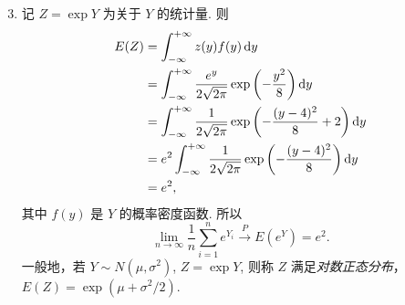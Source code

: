 \begin{solution}
    \begin{enumerate}
        \setcounter{enumi}{2}
        \item 记 $Z = \exp Y$ 为关于 $Y$ 的统计量. 则
        \begin{align*}
            E(Z) 
            &= \int_{-\infty}^{+\infty} z(y) f(y) \dif y \\
            &= \int_{-\infty}^{+\infty} \frac{e^y}{2\sqrt{2\pi}} \exp\del[3]{-\frac{y^2}{8}} \dif y \\
            &= \int_{-\infty}^{+\infty} \frac{1}{2\sqrt{2\pi}} \exp\del[3]{-\frac{(y - 4)^2}{8} + 2} \dif y \\
            &= e^2 \int_{-\infty}^{+\infty} \frac{1}{2\sqrt{2\pi}} \exp\del[3]{-\frac{(y - 4)^2}{8}} \dif y \\
            &= e^2,
        \end{align*}
        其中 $f(y)$ 是 $Y$ 的概率密度函数. 所以
        \[
            \lim_{n \to \infty} \frac 1n \sum_{i = 1}^n e^{Y_i}
            \stackrel{P}{\to} E(e^Y)
            = e^2.
        \]
        一般地，若 $Y \sim N(\mu, \sigma^2)$, $Z = \exp Y$, 则称 $Z$ 满足\emph{对数正态分布}，$E(Z) = \exp(\mu + \sigma^2 / 2)$.
    \end{enumerate}
\end{solution}